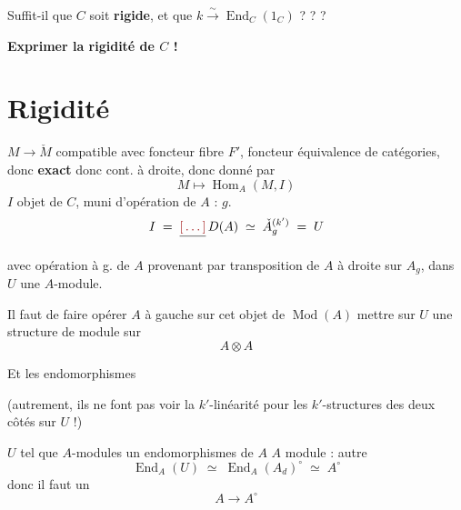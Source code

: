 \documentclass[11pt,a4paper]{article}
\begin{document}

Suffit-il que $C$ soit \textbf{rigide}, et que $k \overset{\sim}{\to}
\operatorname{End}_{C}(1_{C})$ ? ? ?

\textbf{Exprimer la rigidité de $C$ !} 

\section*{Rigidité}



$M \to \check{M}$  compatible avec foncteur fibre $F'$,
foncteur équivalence de catégories, donc \textbf{exact} donc cont. à droite,
\struck{\ill{}} donc donné par
\[
M \longmapsto \operatorname{Hom}_{A}(M, I)
\]
$I$ objet de $C$, muni d'opération de $A$ : $g$.
\[
I \;=\; \struck{\ill{}}\, D(A) \;\simeq\; \check{A}_{g}^{(k')} \;=\; U
\]


avec opération à g. de $A$ provenant par transposition 
de $A$ à droite sur $A_{g}$, dans $U$ \ill{} une $A$-module.

Il faut de faire opérer $A$ à gauche sur \ill{} cet objet de
$\operatorname{Mod}(A)$ \ill{} mettre sur $U$ une structure de
 module sur
\[
A \otimes A
\]

Et les endomorphismes \ill{}


\ill{} (autrement, ils ne font pas voir \ill{} la $k'$-linéarité \ill{} pour
les $k'$-structures des deux côtés sur $U$ !)

$U$ \ill{} tel que \ill{} $A$-modules \ill{} un \ill{} \ill{} endomorphismes de
$A$ \ill{} $A$ module : autre \ill{}
\[
\operatorname{End}_{A}(U) \;\simeq\; \operatorname{End}_{A}(A_{d})^{\circ}
\;\simeq\; A^{\circ}
\]
donc il faut un  \ill{}
\[
A \longrightarrow A^{\circ}
\]
\end{document}
